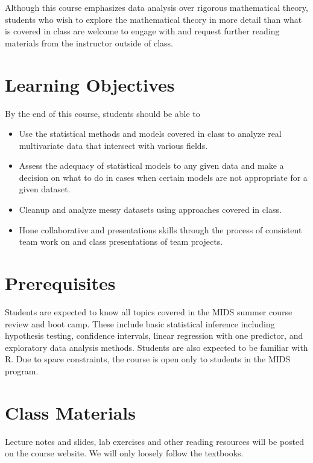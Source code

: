 \documentclass[11pt, a4paper]{article}
\begin{document}
Although this course emphasizes data analysis over rigorous mathematical theory, students who wish to explore the mathematical theory in more detail than what is covered in class are welcome to engage with and request further reading materials from the instructor outside of class.


\section{Learning Objectives}
By the end of this course, students should be able to
\begin{itemize}[label= {\color{darkblue}{\ArrowBoldRightStrobe}}]
	\item Use the statistical methods and models covered in class to analyze real multivariate data that intersect with various fields. 
	\item Assess the adequacy of statistical models to any given data and make a decision on what to do in cases when certain models are not appropriate for a given dataset.
	\item Cleanup and analyze messy datasets using approaches covered in class.
	\item Hone collaborative and presentations skills through the process of consistent team work on and class presentations of team projects.
\end{itemize}



\section{Prerequisites}
Students are expected to know all topics covered in the MIDS summer course review and boot camp. These include basic statistical inference including hypothesis testing, confidence intervals, linear regression with one predictor, and exploratory data analysis methods. Students are also expected to be familiar with \textsf{R}. Due to space constraints, the course is open only to students in the MIDS program.


\section{Class Materials}
Lecture notes and slides, lab exercises and other reading resources will be posted on the course website. We will only loosely follow the textbooks.
\end{document}

